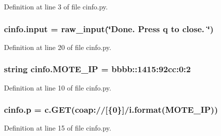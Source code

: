 Definition at line 3 of file cinfo.\+py.

\subsubsection[{\texorpdfstring{input}{input}}]{\setlength{\rightskip}{0pt plus 5cm}cinfo.\+input = raw\+\_\+input(\char`\"{}Done. Press q to close. \char`\"{})}\hypertarget{namespacecinfo_ae6d7eed2fc46abd34a0c47cd8f45f774}{}\label{namespacecinfo_ae6d7eed2fc46abd34a0c47cd8f45f774}


Definition at line 20 of file cinfo.\+py.

\subsubsection[{\texorpdfstring{M\+O\+T\+E\+\_\+\+IP}{MOTE_IP}}]{\setlength{\rightskip}{0pt plus 5cm}string cinfo.\+M\+O\+T\+E\+\_\+\+IP = \textquotesingle{}bbbb\+::1415\+:92cc\+:0\+:2\textquotesingle{}}\hypertarget{namespacecinfo_a309730c64bf612297f7e4dd6ea988cb1}{}\label{namespacecinfo_a309730c64bf612297f7e4dd6ea988cb1}


Definition at line 10 of file cinfo.\+py.

\subsubsection[{\texorpdfstring{p}{p}}]{\setlength{\rightskip}{0pt plus 5cm}cinfo.\+p = c.\+G\+ET(\textquotesingle{}coap\+://\mbox{[}\{0\}\mbox{]}/{\bf i}\textquotesingle{}.format({\bf M\+O\+T\+E\+\_\+\+IP}))}\hypertarget{namespacecinfo_aa27f827c5a44f94ddbdbe36b7503e872}{}\label{namespacecinfo_aa27f827c5a44f94ddbdbe36b7503e872}


Definition at line 15 of file cinfo.\+py.

